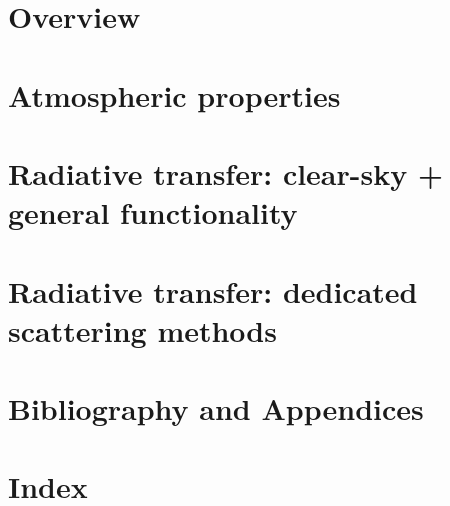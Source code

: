 \documentclass[11pt,twoside,a4paper,fleqn]{book}
\begin{document}
%
\newpage
\thispagestyle{empty}
\rule{0pt}{10pt}
\newpage

\tableofcontents

\cleardoublepage
{}
     


\part{Overview}







\part{Atmospheric properties}





\part{Radiative transfer: clear-sky + 
      general functionality}











\part{Radiative transfer: dedicated 
      scattering methods}






\part{Bibliography and Appendices}
%



\part{Index}
%
\printindex


\end{document}
